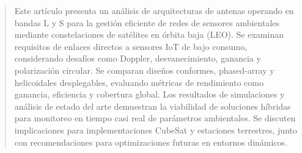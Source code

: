 \begin{abstract}
Este artículo presenta un análisis de arquitecturas de antenas operando en bandas L y S para la gestión eficiente de redes de sensores ambientales mediante constelaciones de satélites en órbita baja (LEO). Se examinan requisitos de enlaces directos a sensores IoT de bajo consumo, considerando desafíos como Doppler, desvanecimiento, ganancia y polarización circular. Se comparan diseños conformes, phased-array y helicoidales desplegables, evaluando métricas de rendimiento como ganancia, eficiencia y cobertura global. Los resultados de simulaciones y análisis de estado del arte demuestran la viabilidad de soluciones híbridas para monitoreo en tiempo casi real de parámetros ambientales. Se discuten implicaciones para implementaciones CubeSat y estaciones terrestres, junto con recomendaciones para optimizaciones futuras en entornos dinámicos.
\end{abstract}